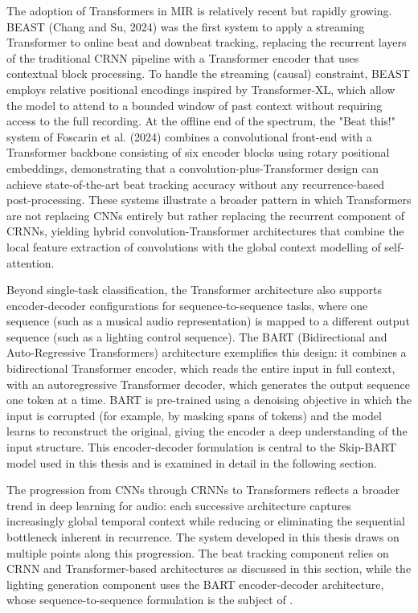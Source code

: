 The adoption of Transformers in MIR is relatively recent but rapidly growing. BEAST (Chang and Su, 2024) was the first system to apply a streaming Transformer to online beat and downbeat tracking, replacing the recurrent layers of the traditional CRNN pipeline with a Transformer encoder that uses contextual block processing.\cite{chang2024beast}   To handle the streaming (causal) constraint, BEAST employs relative positional encodings inspired by Transformer-XL, which allow the model to attend to a bounded window of past context without requiring access to the full recording.\cite{chang2024beast}   At the offline end of the spectrum, the "Beat this!" system of Foscarin et al. (2024) combines a convolutional front-end with a Transformer backbone consisting of six encoder blocks using rotary positional embeddings, demonstrating that a convolution-plus-Transformer design can achieve state-of-the-art beat tracking accuracy without any recurrence-based post-processing.\cite{foscarin2024beatthis}    These systems illustrate a broader pattern in which Transformers are not replacing CNNs entirely but rather replacing the recurrent component of CRNNs, yielding hybrid convolution-Transformer architectures that combine the local feature extraction of convolutions with the global context modelling of self-attention.

Beyond single-task classification, the Transformer architecture also supports encoder-decoder configurations for sequence-to-sequence tasks, where one sequence (such as a musical audio representation) is mapped to a different output sequence (such as a lighting control sequence). The BART (Bidirectional and Auto-Regressive Transformers) architecture exemplifies this design: it combines a bidirectional Transformer encoder, which reads the entire input in full context, with an autoregressive Transformer decoder, which generates the output sequence one token at a time.\cite{zhao2025automatic}   BART is pre-trained using a denoising objective in which the input is corrupted (for example, by masking spans of tokens) and the model learns to reconstruct the original, giving the encoder a deep understanding of the input structure.\cite{zhao2025automatic}   This encoder-decoder formulation is central to the Skip-BART model used in this thesis and is examined in detail in the following section.

The progression from CNNs through CRNNs to Transformers reflects a broader trend in deep learning for audio: each successive architecture captures increasingly global temporal context while reducing or eliminating the sequential bottleneck inherent in recurrence. The system developed in this thesis draws on multiple points along this progression. The beat tracking component relies on CRNN and Transformer-based architectures as discussed in this section, while the lighting generation component uses the BART encoder-decoder architecture, whose sequence-to-sequence formulation is the subject of .

